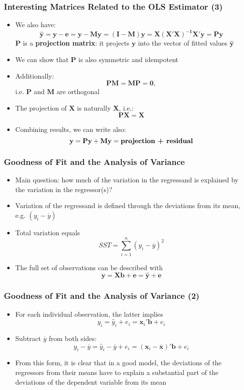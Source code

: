 \documentclass[10pt]{beamer}
\theoremstyle{definition}
\begin{document}
\begin{frame}[fragile]
\frametitle{Interesting Matrices Related to the OLS Estimator (3)}
\begin{itemize}
	\item We also have:
	\[
		\mathbf{\widehat{y} = y -e = y - My = (I-M)y = X(X'X)^{-1}X'y = Py} 
	\]
	$\mathbf{P}$ is a \textbf{projection matrix}: it projects $\mathbf{y}$ into the vector of fitted values $\mathbf{\widehat{y}}$
	\item We can show that $\mathbf{P}$ is also symmetric and idempotent
	\item Additionally:
	\[
		\mathbf{PM = MP = 0}, 
	\]
	i.e. $\mathbf{P}$ and $\mathbf{M}$ are orthogonal
	\item The projection of $\mathbf{X}$ is naturally $\mathbf{X}$, i.e.:
	\[
		\mathbf{PX = X}
	\]
	\item Combining results, we can write also:
	\[
		\mathbf{y = Py + My} = \textrm{\textbf{projection + residual}}
	\]
\end{itemize}
\end{frame}

\iffalse
\begin{frame}[fragile]
\frametitle{Goodness of Fit and the Analysis of Variance}
\begin{itemize}
	\item Main question: how much of the variation in the regressand is explained by the variation in the regressor(s)?
	\item Variation of the regressand is defined through the deviations from its mean, e.g. $(y_{i} - \overline{y})$
	\item Total variation equals
	\[
		SST = \sum_{i=1}^{n} (y_{i} - \overline{y})^{2}
	\]
	\item The full set of observations can be described with
	\[
		\mathbf{y = Xb + e = \widehat{y} + e}
	\]
\end{itemize}
\end{frame}

\begin{frame}[fragile]
\frametitle{Goodness of Fit and the Analysis of Variance (2)}
\begin{itemize}
	\item For each individual observation, the latter implies
	\[
		y_{i} = \widehat{y}_{i} + e_{i} = \mathbf{x}_{i}'\mathbf{b} + e_{i}
	\]
	\item Subtract $\overline{y}$ from both sides:
	\[
		y_{i} - \overline{y} = \widehat{y}_{i} - \overline{y} + e_{i} = (\mathbf{x}_{i} - \overline{\mathbf{x}})'\mathbf{b} + e_{i}
	\]
	\item From this form, it is clear that in a good model, the deviations of the regressors from their means have to explain a substantial part of the deviations of the dependent variable from its mean
\end{itemize}
\end{frame}
\end{document}
